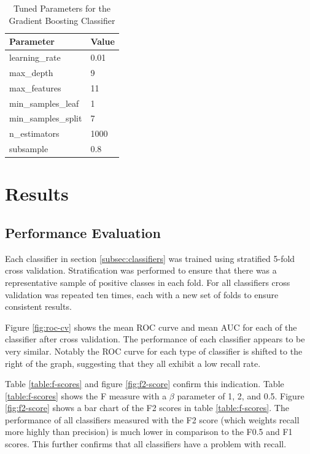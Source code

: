 \documentclass[journal]{IEEEtran}
\begin{document}
\begin{table}
\centering
\caption{Tuned Parameters for the Gradient Boosting Classifier}
\begin{tabular}{|l|l|}
\hline
\textbf{Parameter}                &       \textbf{Value}    \\
\hline
learning\_rate            &      0.01 \\ \hline
max\_depth                &         9 \\ \hline
max\_features             &        11 \\ \hline
min\_samples\_leaf         &         1 \\ \hline
min\_samples\_split        &         7 \\ \hline
n\_estimators             &      1000 \\ \hline
subsample                &       0.8 \\ \hline
\end{tabular}
\label{table:gb-parameters}

\end{table}


\section{Results}
\label{sec:results}

\subsection{Performance Evaluation}
\label{subsec:performance}

Each classifier in section \ref{subsec:classifiers} was trained using stratified 5-fold cross validation. Stratification was performed to ensure that there was a representative sample of positive classes in each fold. For all classifiers cross validation was repeated ten times, each with a new set of folds to ensure consistent results.

Figure \ref{fig:roc-cv} shows the mean ROC curve and mean AUC for each of the classifier after cross validation. The performance of each classifier appears to be very similar. Notably the ROC curve for each type of classifier is shifted to the right of the graph, suggesting that they all exhibit a low recall rate.

Table \ref{table:f-scores} and figure \ref{fig:f2-score} confirm this indication. Table \ref{table:f-scores} shows the F measure with a $\beta$ parameter of 1, 2, and 0.5. Figure \ref{fig:f2-score} shows a bar chart of the F2 scores in table \ref{table:f-scores}. The performance of all classifiers measured with the F2 score (which weights recall more highly than precision) is much lower in comparison to the F0.5 and F1 scores. This further confirms that all classifiers have a problem with recall.
\end{document}
